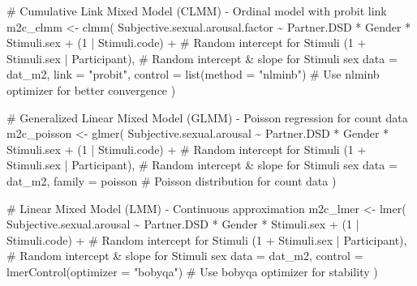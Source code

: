 \documentclass[
  bookmarksnumbered]{article}
\newenvironment{Shaded}{\begin{snugshade}}{\end{snugshade}}
\newcommand{\AttributeTok}[1]{\textcolor[rgb]{0.80,0.80,0.80}{#1}}
\newcommand{\CommentTok}[1]{\textcolor[rgb]{0.50,0.62,0.50}{#1}}
\newcommand{\DecValTok}[1]{\textcolor[rgb]{0.86,0.86,0.80}{#1}}
\newcommand{\FunctionTok}[1]{\textcolor[rgb]{0.94,0.94,0.56}{#1}}
\newcommand{\NormalTok}[1]{\textcolor[rgb]{0.80,0.80,0.80}{#1}}
\newcommand{\OtherTok}[1]{\textcolor[rgb]{0.94,0.94,0.56}{#1}}
\newcommand{\SpecialCharTok}[1]{\textcolor[rgb]{0.86,0.64,0.64}{#1}}
\newcommand{\StringTok}[1]{\textcolor[rgb]{0.80,0.58,0.58}{#1}}
\begin{document}
\begin{Shaded}
\begin{Highlighting}[]
\CommentTok{\# Cumulative Link Mixed Model (CLMM) {-} Ordinal model with probit link}
\NormalTok{m2c\_clmm }\OtherTok{\textless{}{-}} \FunctionTok{clmm}\NormalTok{(}
\NormalTok{  Subjective.sexual.arousal.factor }\SpecialCharTok{\textasciitilde{}}\NormalTok{ Partner.DSD }\SpecialCharTok{*}\NormalTok{ Gender }\SpecialCharTok{*}\NormalTok{ Stimuli.sex }\SpecialCharTok{+}
\NormalTok{    (}\DecValTok{1} \SpecialCharTok{|}\NormalTok{ Stimuli.code) }\SpecialCharTok{+} \CommentTok{\# Random intercept for Stimuli}
\NormalTok{    (}\DecValTok{1} \SpecialCharTok{+}\NormalTok{ Stimuli.sex }\SpecialCharTok{|}\NormalTok{ Participant), }\CommentTok{\# Random intercept \& slope for Stimuli sex}
  \AttributeTok{data =}\NormalTok{ dat\_m2,}
  \AttributeTok{link =} \StringTok{"probit"}\NormalTok{,}
  \AttributeTok{control =} \FunctionTok{list}\NormalTok{(}\AttributeTok{method =} \StringTok{"nlminb"}\NormalTok{) }\CommentTok{\# Use \textquotesingle{}nlminb\textquotesingle{} optimizer for better convergence}
\NormalTok{)}

\CommentTok{\# Generalized Linear Mixed Model (GLMM) {-} Poisson regression for count data}
\NormalTok{m2c\_poisson }\OtherTok{\textless{}{-}} \FunctionTok{glmer}\NormalTok{(}
\NormalTok{  Subjective.sexual.arousal }\SpecialCharTok{\textasciitilde{}}\NormalTok{ Partner.DSD }\SpecialCharTok{*}\NormalTok{ Gender }\SpecialCharTok{*}\NormalTok{ Stimuli.sex }\SpecialCharTok{+}
\NormalTok{    (}\DecValTok{1} \SpecialCharTok{|}\NormalTok{ Stimuli.code) }\SpecialCharTok{+} \CommentTok{\# Random intercept for Stimuli}
\NormalTok{    (}\DecValTok{1} \SpecialCharTok{+}\NormalTok{ Stimuli.sex }\SpecialCharTok{|}\NormalTok{ Participant), }\CommentTok{\# Random intercept \& slope for Stimuli sex}
  \AttributeTok{data =}\NormalTok{ dat\_m2,}
  \AttributeTok{family =}\NormalTok{ poisson }\CommentTok{\# Poisson distribution for count data}
\NormalTok{)}

\CommentTok{\# Linear Mixed Model (LMM) {-} Continuous approximation}
\NormalTok{m2c\_lmer }\OtherTok{\textless{}{-}} \FunctionTok{lmer}\NormalTok{(}
\NormalTok{  Subjective.sexual.arousal }\SpecialCharTok{\textasciitilde{}}\NormalTok{ Partner.DSD }\SpecialCharTok{*}\NormalTok{ Gender }\SpecialCharTok{*}\NormalTok{ Stimuli.sex }\SpecialCharTok{+}
\NormalTok{    (}\DecValTok{1} \SpecialCharTok{|}\NormalTok{ Stimuli.code) }\SpecialCharTok{+} \CommentTok{\# Random intercept for Stimuli}
\NormalTok{    (}\DecValTok{1} \SpecialCharTok{+}\NormalTok{ Stimuli.sex }\SpecialCharTok{|}\NormalTok{ Participant), }\CommentTok{\# Random intercept \& slope for Stimuli sex}
  \AttributeTok{data =}\NormalTok{ dat\_m2,}
  \AttributeTok{control =} \FunctionTok{lmerControl}\NormalTok{(}\AttributeTok{optimizer =} \StringTok{"bobyqa"}\NormalTok{) }\CommentTok{\# Use \textquotesingle{}bobyqa\textquotesingle{} optimizer for stability}
\NormalTok{)}
\end{Highlighting}
\end{Shaded}
\end{document}
